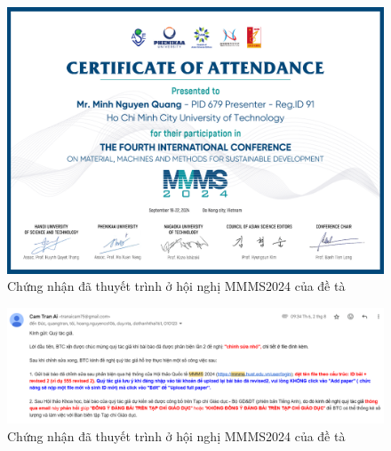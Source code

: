         \begin{figure}[H]
            \centering
            \includegraphics[width=0.8\linewidth, height=0.3\textheight]{images/present.png}
            \vspace{0.6cm}
            \caption{Chứng nhận đã thuyết trình ở hội nghị MMMS2024 của đề tà}
        \end{figure}
    
        \begin{figure}[H]
            \centering
            \includegraphics[width=0.8\linewidth]{images/email.png}
            \vspace{0.6cm}
            \caption{Chứng nhận đã thuyết trình ở hội nghị MMMS2024 của đề tà}
        \end{figure}
